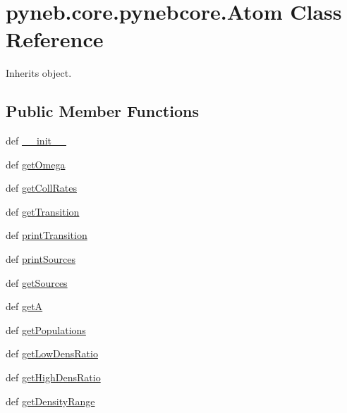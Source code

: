 \hypertarget{classpyneb_1_1core_1_1pynebcore_1_1_atom}{\section{pyneb.\-core.\-pynebcore.\-Atom Class Reference}
\label{classpyneb_1_1core_1_1pynebcore_1_1_atom}
}


Inherits object.

\subsection*{Public Member Functions}
\begin{DoxyCompactItemize}
\item 
def \hyperlink{classpyneb_1_1core_1_1pynebcore_1_1_atom_ad92916e464a9e193eb3e49b84f253a35}{\-\_\-\-\_\-init\-\_\-\-\_\-}
\item 
def \hyperlink{classpyneb_1_1core_1_1pynebcore_1_1_atom_ae133eed382e284df01f2183da341534b}{get\-Omega}
\item 
def \hyperlink{classpyneb_1_1core_1_1pynebcore_1_1_atom_a34711ea989baf7bde752a68255d32098}{get\-Coll\-Rates}
\item 
def \hyperlink{classpyneb_1_1core_1_1pynebcore_1_1_atom_a7c9f17a3d9e841267add92377d9d1ede}{get\-Transition}
\item 
def \hyperlink{classpyneb_1_1core_1_1pynebcore_1_1_atom_a32f644fb6c648326e3422984b614b63c}{print\-Transition}
\item 
def \hyperlink{classpyneb_1_1core_1_1pynebcore_1_1_atom_a09c7f821dd9cf7ab09477fc80906e769}{print\-Sources}
\item 
def \hyperlink{classpyneb_1_1core_1_1pynebcore_1_1_atom_a494480eb44909d9a13ed1fb2e808b4a2}{get\-Sources}
\item 
def \hyperlink{classpyneb_1_1core_1_1pynebcore_1_1_atom_a4b3ea50d7c77fdf645c2cea97243c17e}{get\-A}
\item 
def \hyperlink{classpyneb_1_1core_1_1pynebcore_1_1_atom_aab7496403c8aaef40ab3b20b5c00e9f0}{get\-Populations}
\item 
def \hyperlink{classpyneb_1_1core_1_1pynebcore_1_1_atom_aa6db2a3425e5a35f0bd04f05bcb25ee1}{get\-Low\-Dens\-Ratio}
\item 
def \hyperlink{classpyneb_1_1core_1_1pynebcore_1_1_atom_ac2e1509a2acc642c00696f3787e95f95}{get\-High\-Dens\-Ratio}
\item 
def \hyperlink{classpyneb_1_1core_1_1pynebcore_1_1_atom_a30ea60641df87c5eaf8af392d31da920}{get\-Density\-Range}

\end{DoxyCompactItemize}
